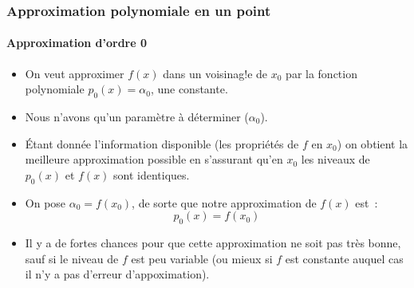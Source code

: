 \documentclass[10pt,notheorems]{beamer}
\theoremstyle{plain}
\theoremstyle{definition} %
\begin{document}
\begin{frame}
  \frametitle{Approximation polynomiale en un point}
  \framesubtitle{Approximation d'ordre 0}
  \hypertarget{slide_taylor_3}{}

  \begin{itemize}

  \item On veut approximer $f(x)$ dans un voisinag!e de $x_0$ par la fonction polynomiale $p_0(x) = \alpha_0$, une constante.\newline

  \item Nous n'avons qu'un paramètre à déterminer ($\alpha_0$).\newline

  \item Étant donnée l'information disponible (les propriétés de $f$ en $x_0$) on obtient la meilleure approximation possible en s'assurant qu'en $x_0$ les niveaux de $p_0(x)$ et $f(x)$ sont identiques.\newline

  \item On pose $\alpha_0 = f(x_0)$, de sorte que notre approximation de $f(x)$ est~:
    \[
      p_0(x) = f(x_0)
    \]

  \item Il y a de fortes chances pour que cette approximation ne soit pas très bonne, sauf si le niveau de $f$ est peu variable (ou mieux si $f$ est constante auquel cas il n'y a pas d'erreur d'appoximation).

  \end{itemize}

\end{frame}
\end{document}
